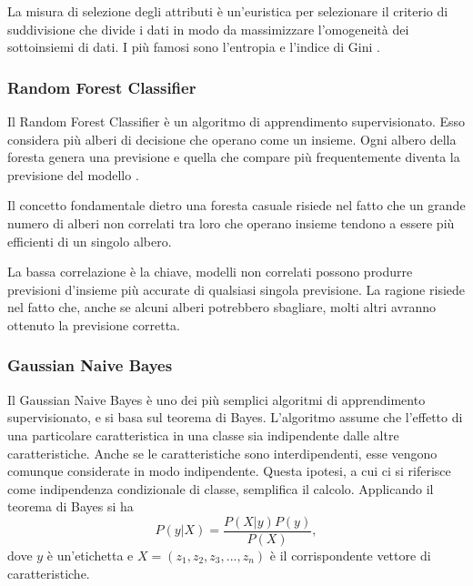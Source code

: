 \documentclass[12pt,italian]{report}
\begin{document}
La misura di selezione degli attributi è un'euristica per selezionare il criterio di suddivisione che divide i dati in modo da massimizzare l'omogeneità dei sottoinsiemi di dati. I più famosi sono l'entropia e l'indice di Gini \cite{DataMiningandKnowledgeDiscoveryHandbook}.

\subsubsection{Random Forest Classifier}
Il Random Forest Classifier è un algoritmo di apprendimento supervisionato. Esso considera più alberi di decisione che operano come un insieme. Ogni albero della foresta genera una previsione e quella che compare più frequentemente diventa la previsione del modello \cite{RandomForest}.

Il concetto fondamentale dietro una foresta casuale risiede nel fatto che un grande numero di alberi non correlati tra loro che operano insieme tendono a essere più efficienti di un singolo albero.

La bassa correlazione è la chiave, modelli non correlati possono produrre previsioni d'insieme più accurate di qualsiasi singola previsione. La ragione risiede nel fatto che, anche se alcuni alberi potrebbero sbagliare, molti altri avranno ottenuto la previsione corretta.
\subsubsection{Gaussian Naive Bayes}
Il Gaussian Naive Bayes è uno dei più semplici algoritmi di apprendimento supervisionato, e si basa sul teorema di Bayes. L'algoritmo assume che l'effetto di una particolare caratteristica in una classe sia indipendente dalle altre caratteristiche. Anche se le caratteristiche sono interdipendenti, esse vengono comunque considerate in modo indipendente\cite{Mitchell97}. Questa ipotesi, a cui ci si riferisce come indipendenza condizionale di classe, semplifica il calcolo.
Applicando il teorema di Bayes si ha
\begin{equation}
P(y | X) = \frac{P(X | y) P(y)}{P(X)},
\end{equation}
dove $y$ è un'etichetta e $X = (z_1, z_2, z_3,...,z_n)$ è il corrispondente vettore di caratteristiche.
\end{document}
